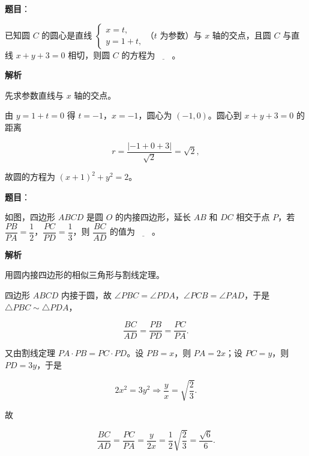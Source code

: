 \begin{answer}

\textbf{题目}：

已知圆 $C$ 的圆心是直线 $\begin{cases}x=t,\\ y=1+t,\end{cases}$（$t$ 为参数）与 $x$ 轴的交点，且圆 $C$ 与直线 $x+y+3=0$ 相切，则圆 $C$ 的方程为$\underline{\qquad}$。

\textbf{解析}

先求参数直线与 $x$ 轴的交点。

由 $y=1+t=0$ 得 $t=-1$，$x=-1$，圆心为 $(-1,0)$。圆心到 $x+y+3=0$ 的距离

\nopagebreak[4]
\[r=\frac{|-1+0+3|}{\sqrt2}=\sqrt2,\]

故圆的方程为 $(x+1)^2+y^2=2$。


\end{answer}
\begin{answer}

\textbf{题目}：

如图，四边形 $ABCD$ 是圆 $O$ 的内接四边形，延长 $AB$ 和 $DC$ 相交于点 $P$，若 $\dfrac{PB}{PA}=\dfrac12$，$\dfrac{PC}{PD}=\dfrac13$，则 $\dfrac{BC}{AD}$ 的值为$\underline{\qquad}$。
\nopagebreak[4]
\begin{center}\end{center}
\nopagebreak[4]
\textbf{解析}

用圆内接四边形的相似三角形与割线定理。

四边形 $ABCD$ 内接于圆，故 $\angle PBC=\angle PDA$，$\angle PCB=\angle PAD$，于是 $\triangle PBC\sim\triangle PDA$，

\nopagebreak[4]
\[\frac{BC}{AD}=\frac{PB}{PD}=\frac{PC}{PA}.\]

又由割线定理 $PA\cdot PB=PC\cdot PD$。设 $PB=x$，则 $PA=2x$；设 $PC=y$，则 $PD=3y$，于是

\nopagebreak[4]
\[2x^2=3y^2\Longrightarrow \frac yx=\sqrt{\frac23}.\]

故

\nopagebreak[4]
\[\frac{BC}{AD}=\frac{PC}{PA}=\frac{y}{2x}=\frac12\sqrt{\frac23}=\frac{\sqrt6}6.\]


\end{answer}
